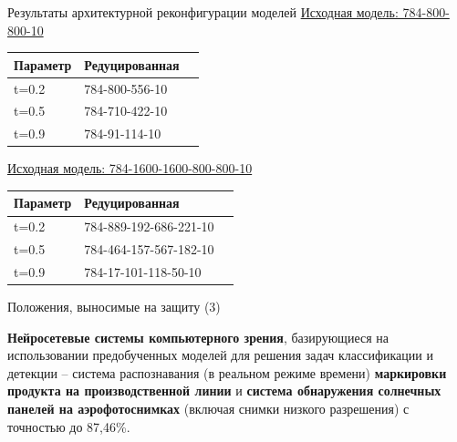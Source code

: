\documentclass[10pt]{beamer}
\begin{document}
        \begin{frame}{Результаты архитектурной реконфигурации моделей}
            \underline{Исходная модель: 784-800-800-10}
            \begin{table} [!h]
              \small
                \centering
                \begin{tabular}{| p{2cm} | p{4cm} | p{4cm} |}
                \hline
                    \textbf{Параметр} & \textbf{Редуцированная}\\
                \hline
                t=0.2 & 784-800-556-10\\
                \hline
                t=0.5 & 784-710-422-10\\
                \hline
                t=0.9 & 784-91-114-10\\
                \hline
                \end{tabular}
                \end{table}

                \underline{Исходная модель: 784-1600-1600-800-800-10}
              \begin{table} [!h]
              \small
                \centering
                \begin{tabular}{| p{2cm} | p{4cm} | p{4cm} |}
                \hline
                    \textbf{Параметр} &  \textbf{Редуцированная}\\
                \hline
                t=0.2 & 784-889-192-686-221-10\\
                \hline
                t=0.5 & 784-464-157-567-182-10\\
                \hline
                t=0.9 & 784-17-101-118-50-10\\
                \hline
                \end{tabular}
            \end{table}
            
        \end{frame}

        \begin{frame}{Положения, выносимые на защиту (3)}
            \begin{block}{3}
                \large
                \textbf{Нейросетевые системы компьютерного зрения}, базирующиеся на использовании предобученных моделей для решения задач классификации и детекции -- система распознавания (в реальном режиме времени) \textbf{маркировки продукта на производственной линии} и \textbf{система обнаружения солнечных панелей на аэрофотоснимках} (включая снимки низкого разрешения) с точностью до 87,46\%.
            \end{block}
        \end{frame}
\end{document}
